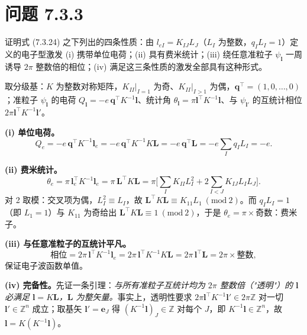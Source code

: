 \section*{问题 7.3.3}
\begin{problem}
证明式 (7.3.24) 之下列出的四条性质：由 $l_{eI}=K_{IJ}L_J$（$L_I$ 为整数，$q_IL_I=1$）定义的电子型激发 (i) 携带单位电荷；(ii) 具有费米统计；(iii) 绕任意准粒子 $\psi_{\pmb{l}}$ 一周诱导 $2\pi$ 整数倍的相位；(iv) 满足这三条性质的激发全部具有这种形式。
\end{problem}
\solution
取分级基：$K$ 为整数对称矩阵，$K_{II}|_{I=1}$ 为奇、$K_{II}|_{I>1}$ 为偶，$\pmb{q}^{\top}=(1,0,\dots,0)$；准粒子 $\psi_{\pmb{l}}$ 的电荷 $Q_{\pmb{l}}=-e\,\pmb{q}^{\top}K^{-1}\pmb{l}$、统计角 $\theta_{\pmb{l}}=\pi\pmb{l}^{\top}K^{-1}\pmb{l}$、与 $\psi_{\pmb{l}'}$ 的互统计相位 $2\pi\pmb{l}^{\top}K^{-1}\pmb{l}'$。

\textbf{(i) 单位电荷。}
\begin{equation*}
Q_e=-e\,\pmb{q}^{\top}K^{-1}\pmb{l}_e
=-e\,\pmb{q}^{\top}K^{-1}K\pmb{L}
=-e\,\pmb{q}^{\top}\pmb{L}
=-e\sum_Iq_IL_I=-e .
\end{equation*}

\textbf{(ii) 费米统计。}
\begin{equation*}
\theta_e=\pi\,\pmb{l}_e^{\top}K^{-1}\pmb{l}_e
=\pi\,\pmb{L}^{\top}K\pmb{L}
=\pi\Big[\sum_IK_{II}L_I^2+2\sum_{I<J}K_{IJ}L_IL_J\Big].
\end{equation*}
对 2 取模：交叉项为偶，$L_I^2\equiv L_I$，故 $\pmb{L}^{\top}K\pmb{L}\equiv K_{11}L_1\ (\mathrm{mod}\ 2)$。而 $q_IL_I=1$（即 $L_1=1$）与 $K_{11}$ 为奇给出 $\pmb{L}^{\top}K\pmb{L}\equiv1\ (\mathrm{mod}\ 2)$，于是 $\theta_e=\pi\times$奇数：费米子。

\textbf{(iii) 与任意准粒子的互统计平凡。}
\begin{equation*}
\text{相位}=2\pi\,\pmb{l}^{\top}K^{-1}\pmb{l}_e
=2\pi\,\pmb{l}^{\top}K^{-1}K\pmb{L}
=2\pi\,\pmb{l}^{\top}\pmb{L}=2\pi\times\text{整数},
\end{equation*}
保证电子波函数单值。

\textbf{(iv) 完备性。}先证一条引理：\emph{与所有准粒子互统计均为 $2\pi$ 整数倍（"透明"）的 $\pmb{l}$ 必满足 $\pmb{l}=K\pmb{L}$，$\pmb{L}$ 为整矢量。}事实上，透明性要求 $2\pi\pmb{l}^{\top}K^{-1}\pmb{l}'\in2\pi\mathbb Z$ 对一切 $\pmb{l}'\in\mathbb Z^n$ 成立；取基矢 $\pmb{l}'=\pmb{e}_J$ 得 $(K^{-1}\pmb{l})_J\in\mathbb Z$ 对每个 $J$，即 $K^{-1}\pmb{l}\in\mathbb Z^n$，故 $\pmb{l}=K(K^{-1}\pmb{l})$。

